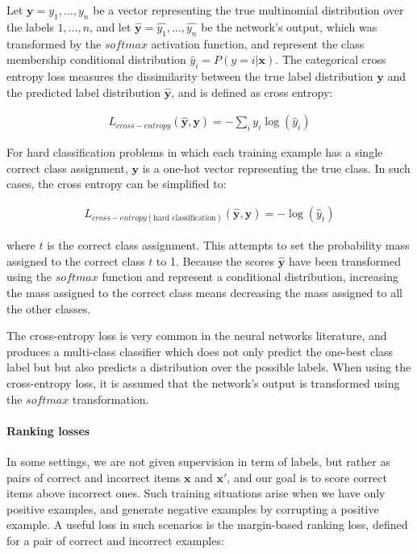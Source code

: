 \documentclass[jair,twoside,11pt,theapa]{article}
\newcommand{\m}[1]{\mathbf{#1}}%
\begin{document}
{Let $\m{y}=y_1,\ldots,y_n$ be a vector representing
the true multinomial distribution over the labels $1,\ldots,n$, and let
$\m{\hat{y}}=\hat{y_1},\ldots,\hat{y_n}$ be the network's output, which was
transformed by the $softmax$ activation function, and represent the class
membership conditional distribution $\hat{y}_i = P(y=i|\m{x})$.
The categorical cross entropy loss measures the dissimilarity between the true label distribution
$\m{y}$ and the predicted label distribution $\m{\hat{y}}$, and is defined as
cross entropy:

\begin{align*}
    L_{cross-entropy}(\m{\hat{y}},\m{y}) = -\sum_i y_i\log(\hat{y}_i)
\end{align*}

For hard classification problems in which each training example has a single
correct class assignment, $\m{y}$ is a one-hot vector representing the true
class. In such cases, the cross entropy can be simplified to:

\begin{align*}
    L_{cross-entropy(\text{hard classification})}(\m{\hat{y}},\m{y}) = -\log(\hat{y}_t)
\end{align*}

\noindent where $t$ is the correct class assignment. This attempts to set the
probability mass assigned to the correct class $t$ to 1. Because the scores
$\m{\hat{y}}$ have been transformed using the $softmax$ function and represent a
conditional distribution, increasing the mass assigned to the correct class
means decreasing the mass assigned to all the other classes.

The cross-entropy loss is very common in the neural networks literature, and
produces a multi-class classifier which does not only predict the one-best
class label but but also predicts a distribution over the possible labels.  When
using the cross-entropy loss, it is assumed that the network's output is transformed
using the $softmax$ transformation.

\paragraph{Ranking losses}  In some settings, we are not given supervision in
term of labels, but rather as pairs of correct and incorrect items $\m{x}$ and
$\m{x'}$, and our goal is to score correct items above incorrect ones. Such
training situations arise when we have only positive examples, and generate
negative examples by corrupting a positive example.  
A useful loss in such scenarios is the margin-based ranking
loss, defined for a pair of correct and incorrect examples:

}
\end{document}
